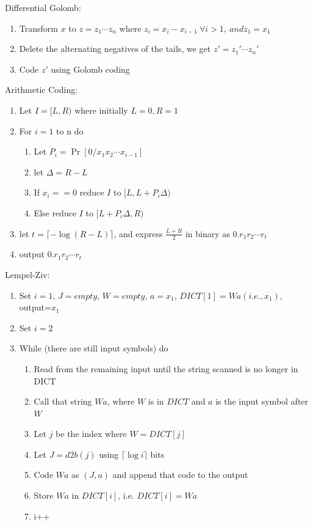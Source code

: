 Differential Golomb:
\begin{enumerate}
    \item Transform $x$ to $z=z_1\cdots z_n$ where $z_i=x_i-x_{i-1}\ \forall i>1,\ and z_1=x_1$
    \item Delete the alternating negatives of the tails, we get $z'=z_1'\cdots z_n'$
    \item Code $z'$ using Golomb coding
\end{enumerate}

Arithmetic Coding:
\begin{enumerate}
    \item Let $I=[L,R)$ where initially $L=0,R=1$
    \item For $i=1$ to n do
    \begin{enumerate}
        \item Let $P_i=\Pr[0/x_1x_2\cdots x_{i-1}]$
        \item let $\Delta=R-L$
        \item If $x_i==0$ reduce $I$ to $[L,L+P_i\Delta)$
        \item Else reduce $I$ to $[L+P_i\Delta,R)$
    \end{enumerate}
    \item let $t=\lceil -\log (R-L) \rceil $, and express $\frac{L+R}{2}$ in binary as $0.r_1r_2\cdots r_t$
    \item output $0.r_1r_2\cdots r_t$
\end{enumerate}

Lempel-Ziv: 
\begin{enumerate}
    \item Set $i=1$, $J=empty$, $W=empty$, $a=x_1$, $DICT[1]=Wa(i.e.,x_1)$, output=$x_1$
    \item Set $i=2$
    \item While (there are still input symbols) do
    \begin{enumerate}
        \item Read from the remaining input until the string scanned is no longer in DICT
        \item Call that string $Wa$, where $W$ is in $DICT$ and $a$ is the input symbol after $W$
        \item Let $j$ be the index where $W=DICT[j]$
        \item Let $J=d2b(j)$ using $\lceil \log i \rceil$ bits
        \item Code $Wa$ as $(J,a)$ and append that code to the output
        \item Store $Wa$ in $DICT[i]$, i.e. $DICT[i]=Wa$
        \item i++
    \end{enumerate}
\end{enumerate}

